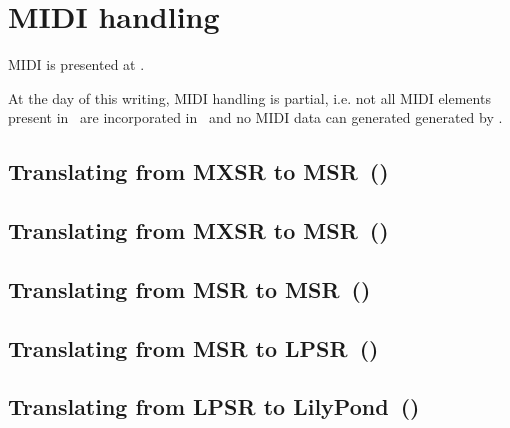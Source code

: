 
\chapter{MIDI handling}\label{MIDI handling}

MIDI is presented at .

At the day of this writing, MIDI handling is partial, i.e. not all MIDI elements present in \mxml\ are incorporated in \msrRepr\, and no MIDI data can generated generated by \mf.


\section{Translating from MXSR to MSR\ (\mxsrToMsr{})}


\section{Translating from MXSR to MSR\ (\mxsrToMsr{})}


\section{Translating from MSR to MSR\ (\msrToMsr{})}


\section{Translating from MSR to LPSR\ (\msrToLpsr{})}


\section{Translating from LPSR to LilyPond\ (\lpsrToLilypond{})}


